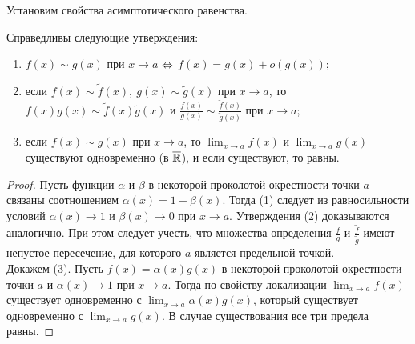     Установим свойства асимптотического равенства.

    \begin{lemma}
        Справедливы следующие утверждения:
        \begin{enumerate}
            \item $f(x) \sim g(x)$ при $x \to a$ $\Leftrightarrow$ $f(x) = g(x) + o(g(x))$;
            \item если $f(x) \sim \tilde f(x), \ g(x) \sim \tilde g(x)$ при $x \to a$, то $f(x)g(x) \sim \tilde f(x) \tilde g(x)$ и $\frac{f(x)}{g(x)} \sim \frac{\tilde f(x)}{\tilde g(x)}$ при $x \to a$;
            \item если $f(x) \sim g(x)$ при $x \to a$, то $\lim_{x \to a}f(x)$ и $\lim_{x \to a}g(x)$ существуют одновременно (в $\overline{\mathbb{R}}$), и если существуют, то равны.
        \end{enumerate}
    \end{lemma}

    \begin{proof}
        Пусть функции $\alpha$ и $\beta$ в некоторой проколотой окрестности точки $a$ связаны соотношением $\alpha(x) = 1 + \beta(x)$. Тогда (1) следует из равносильности условий $\alpha(x) \to 1$ и $\beta(x) \to 0$ при $x \to a$. Утверждения (2) доказываются аналогично. При этом следует учесть, что множества определения $\frac{f}{g}$ и $\frac{\tilde f}{\tilde g}$ имеют непустое пересечение, для которого $a$ является предельной точкой.\\
        Докажем (3). Пусть $f(x) = \alpha(x) g(x)$ в некоторой проколотой окрестности точки $a$ и $\alpha(x) \to 1$ при $x \to a$. Тогда по свойству локализации $\lim_{x \to a} f(x)$ существует одновременно с $\lim_{x \to a} \alpha(x) g(x)$, который существует одновременно с $\lim_{x \to a} g(x)$. В случае существования все три предела равны.
    \end{proof}